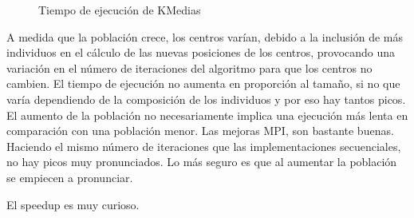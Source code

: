 	
	
			\begin{figure}[!h]
			\centering
			\caption{Tiempo de ejecución de KMedias}
			\end{figure}
			
			
			A medida que la población crece, los centros varían, debido a la inclusión de más individuos en el cálculo de las nuevas posiciones de los centros, provocando una variación en el número de iteraciones del algoritmo para que los centros no cambien. 
			El tiempo de ejecución no aumenta en proporción al tamaño, si no que varía dependiendo de la composición de los individuos y por eso hay tantos picos. El aumento de la población no necesariamente implica una ejecución más lenta en comparación con una población menor.
			Las mejoras MPI, son bastante buenas. Haciendo el mismo número de iteraciones que las implementaciones secuenciales, no hay picos muy pronunciados. Lo más seguro es que al aumentar la población se empiecen a pronunciar.
			
			
			
			El speedup es muy curioso. 
			
